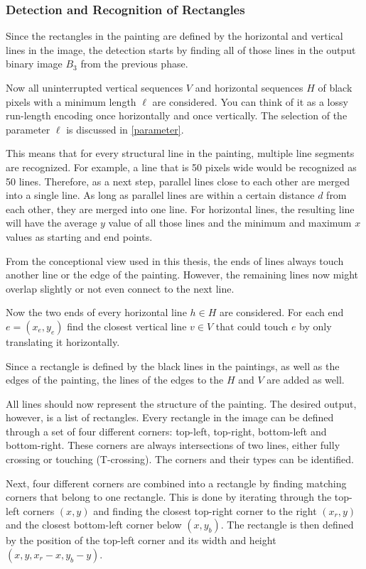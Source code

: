\documentclass[serif,article,noparskip]{agse-thesis}
\begin{document}
\subsubsection{Detection and Recognition of Rectangles} \label{rectangles}

Since the rectangles in the painting are defined by the horizontal and
vertical lines in the image, the detection starts by finding all of those lines
in the output binary image $B_3$ from the previous phase.

Now all uninterrupted vertical sequences $V$ and horizontal sequences $H$ of
black pixels with a minimum length $\ell$ are considered. You can think of it as
a lossy run-length encoding once horizontally and once vertically. The selection
of the parameter $\ell$ is discussed in \ref{parameter}.

This means that for every structural line in the painting, multiple line
segments are recognized. For example, a line that is 50 pixels wide would be
recognized as 50 lines. Therefore, as a next step, parallel lines close to each
other are merged into a single line. As long as parallel lines are within a
certain distance $d$ from each other, they are merged into one line. For
horizontal lines, the resulting line will have the average $y$ value of all
those lines and the minimum and maximum $x$ values as starting and end points.

From the conceptional view used in this thesis, the ends of lines always touch
another line or the edge of the painting. However, the remaining lines now might
overlap slightly or not even connect to the next line.

Now the two ends of every horizontal line $h \in H$ are considered. For each end
$e = (x_e,y_e)$ find the closest vertical line $v \in V$ that could touch $e$ by
only translating it horizontally.

Since a rectangle is defined by the black lines in the paintings, as well as the
edges of the painting, the lines of the edges to the $H$ and $V$ are added as
well.

All lines should now represent the structure of the painting. The desired output,
however, is a list of rectangles. Every rectangle in the image can be defined
through a set of four different corners: top-left, top-right, bottom-left and
bottom-right. These corners are always intersections of two lines, either fully
crossing or touching (T-crossing). The corners and their types can be
identified.

Next, four different corners are combined into a rectangle by finding matching
corners that belong to one rectangle. This is done by iterating through the
top-left corners $(x,y)$ and finding the closest top-right corner to the right
$(x_r, y)$ and the closest bottom-left corner below $(x, y_b)$. The rectangle is
then defined by the position of the top-left corner and its width and height
$(x,y,x_r-x,y_b-y)$.
\end{document}

